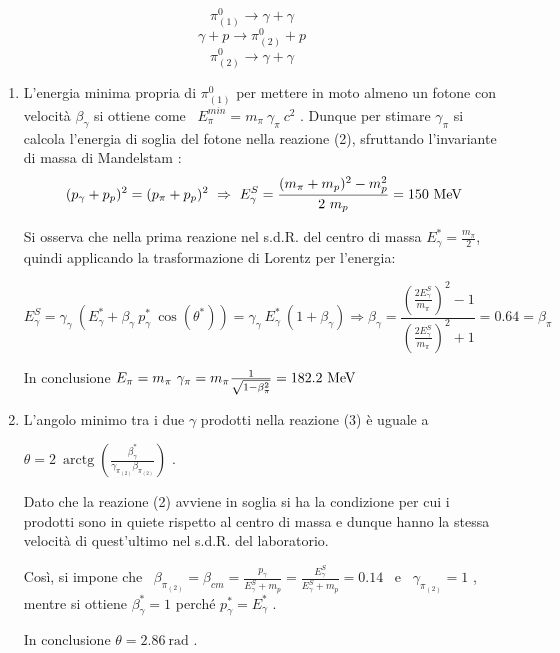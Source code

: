 \documentclass[12pt,twoside,a4]{article}
\DeclareMathOperator{\arctg}{arctg}
\begin{document}
\begin{solution}
	\begin{equation*}
    \pi^0_{(1)} \xrightarrow{} \gamma + \gamma 
 \end{equation*}
 \begin{equation*}
     \gamma + p \xrightarrow{} \pi^0_{(2)} + p 
 \end{equation*}
 \begin{equation*}
    \pi^0_{(2)} \xrightarrow{} \gamma + \gamma 
 \end{equation*}
 
 \begin{enumerate}[label=(\textit{\roman*})]
 	\item L'energia minima propria di $\pi^0_{(1)}$ per mettere in moto almeno un fotone con velocità $\beta_\gamma$ si ottiene come \ $E^{min}_\pi = m_\pi \ \gamma_\pi \ c^2$ . Dunque per stimare $\gamma_\pi$ si calcola l'energia di soglia del fotone nella reazione (2), sfruttando l'invariante di massa di Mandelstam : 
 \begin{equation*}
   (p_\gamma + p_p)^2 = (p_\pi + p_p)^2  \  \Rightarrow  \  E^S_\gamma = \frac{(m_\pi + m_p)^2 - m^2_p}{2 \ m_p} = 150 \ \mathrm{MeV} 
 \end{equation*}
 
 Si osserva che nella prima reazione nel s.d.R. del centro di massa $E^\ast_\gamma = \frac{m_\pi}{2}$, quindi applicando la trasformazione di Lorentz per l'energia: 
 
\begin{equation*}
    E^S_\gamma = \gamma_\gamma \ (E^\ast_\gamma + \beta_\gamma \ p^\ast_\gamma \ \cos{(\theta^\ast)}) = \gamma_\gamma \ E^\ast_\gamma \ (1 + \beta_\gamma)  \Rightarrow \boxed{ \beta_\gamma = \frac{\left(\frac{2 E^S_\gamma }{m_\pi} \right)^2 -1}{\left(\frac{2 E^S_\gamma}{m_\pi}\right)^2 + 1} = 0.64 = \beta_\pi}   
\end{equation*}
 
 In conclusione $E_\pi = m_\pi \ \gamma_\pi = m_\pi \frac{1}{\sqrt{1-\beta^2_\pi}} = 182.2 \ \mathrm{MeV}$
 
 \item L'angolo minimo tra i due $\gamma$ prodotti nella reazione (3) è uguale a 
 
 $\theta = 2 \ \arctg{\left( \frac{\beta^\ast_{\gamma}}{\gamma_{\pi_{(2)}} \beta_{\pi_{(2)}}} \right)}$ . 
 
 \smallskip
 Dato che la reazione (2) avviene in soglia si ha la condizione per cui i prodotti sono in quiete rispetto al centro di massa e dunque hanno la stessa velocità di quest'ultimo nel s.d.R. del laboratorio.
 
 Così, si impone che \ $\beta_{\pi_{(2)}} = \beta_{cm} = \frac{p_\gamma}{E^S_\gamma + m_p} = \frac{E^S_\gamma}{E^S_\gamma + m_p} = 0.14$ \ e \ $\gamma_{\pi_{(2)}} = 1 $ , mentre si ottiene $\beta^\ast_\gamma = 1$ perché $p^\ast_{\gamma} = E^\ast_\gamma$ . 
 
 In conclusione $\theta = 2.86 \ \mathrm{rad}$ .
 \end{enumerate}
 \end{solution}
 
\end{document}
